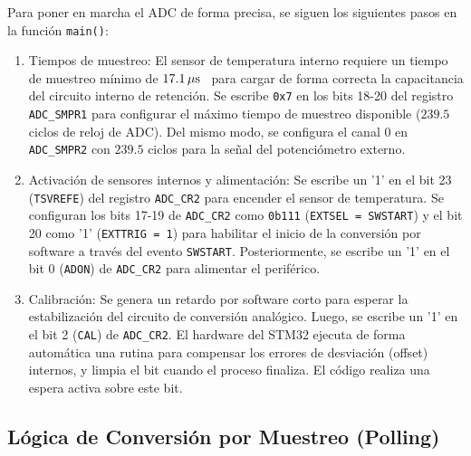 Para poner en marcha el ADC de forma precisa, se siguen los siguientes pasos en la función \texttt{main()}:
\begin{enumerate}
    \item Tiempos de muestreo: El sensor de temperatura interno requiere un tiempo de muestreo mínimo de
    $17.1\,\mathrm{\mu s}$~\cite{stm32f103rm} para cargar de forma correcta la capacitancia del circuito interno de retención. Se
    escribe \texttt{0x7} en los bits 18-20 del registro \texttt{ADC\_SMPR1} para configurar el máximo tiempo de
    muestreo disponible ($239.5$ ciclos de reloj de ADC). Del mismo modo, se configura el canal 0 en \texttt{ADC\_SMPR2}
    con $239.5$ ciclos para la señal del potenciómetro externo.
    \item Activación de sensores internos y alimentación: Se escribe un '1' en el bit 23 (\texttt{TSVREFE})
    del registro \texttt{ADC\_CR2} para encender el sensor de temperatura. Se configuran los bits 17-19 de
    \texttt{ADC\_CR2} como \texttt{0b111} (\texttt{EXTSEL = SWSTART}) y el bit 20 como '1' (\texttt{EXTTRIG = 1}) para
    habilitar el inicio de la conversión por software a través del evento \texttt{SWSTART}. Posteriormente, se escribe
    un '1' en el bit 0 (\texttt{ADON}) de \texttt{ADC\_CR2} para alimentar el periférico.
    \item Calibración: Se genera un retardo por software corto para esperar la estabilización del circuito de
    conversión analógico. Luego, se escribe un '1' en el bit 2 (\texttt{CAL}) de \texttt{ADC\_CR2}. El hardware del
    STM32 ejecuta de forma automática una rutina para compensar los errores de desviación (offset) internos, y limpia
    el bit cuando el proceso finaliza. El código realiza una espera activa sobre este bit.
\end{enumerate}

\subsection{Lógica de Conversión por Muestreo (Polling)}

